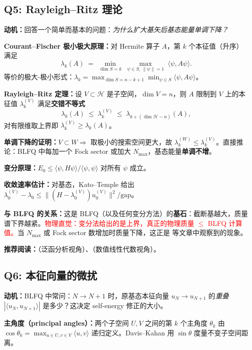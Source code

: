 \documentclass{article}
\begin{document}
\subsection{Q5: Rayleigh--Ritz 理论}

\textbf{动机：}回答一个简单而基本的问题：\emph{为什么扩大基矢后基态能量单调下降？}

\textbf{Courant--Fischer 极小极大原理：}对 Hermite 算子 $A$，第 $k$ 个本征值（升序）满足
\[
\lambda_{k}(A) \;=\; \min_{\dim S=k}\;\max_{\psi\in S,\,\|\psi\|=1}\;\langle\psi,A\psi\rangle.
\]
等价的极大-极小形式：$\lambda_{k}=\max_{\dim S=n-k+1}\min_{\psi\in S}\langle\psi,A\psi\rangle$。

\textbf{Rayleigh--Ritz 定理：}设 $V\subset\mathcal{H}$ 是子空间，$\dim V=n$，则 $A$ 限制到 $V$ 上的本征值 $\lambda_{k}^{(V)}$ 满足\textbf{交错不等式}
\[
\lambda_{k}(A) \;\le\; \lambda_{k}^{(V)} \;\le\; \lambda_{k+( \dim\mathcal{H}-n)}(A),
\]
对有限维取上界即 $\lambda_{k}^{(V)}\ge\lambda_{k}(A)$。

\textbf{单调下降的证明：}$V\subset W\Rightarrow$ 取极小的搜索空间更大，故 $\lambda_{k}^{(W)}\le\lambda_{k}^{(V)}$。直接推论：BLFQ 中每加一个 Fock sector 或加大 $N_{\max}$，基态能量\textbf{单调不增}。

\textbf{变分原理：}$E_{0}\le\langle\psi,H\psi\rangle/\langle\psi,\psi\rangle$ 对所有 $\psi$ 成立。

\textbf{收敛速率估计：}对基态，Kato--Temple 给出 $\lambda_{0}^{(V)}-\lambda_{0}\le \|(H-\lambda_{0}^{(V)})u_{0}^{(V)}\|^{2}/\mathrm{gap}$。

\textbf{与 BLFQ 的关系：}这是 BLFQ（以及任何变分方法）的\textbf{基石}：截断基越大，质量谱下界越紧。\textcolor{red}{物理直觉：变分法给出的是上界，真正的物理质量 $\le$ BLFQ 计算值。}当 $N_{\max}$ 或 Fock sector 数增加时质量下降，这正是 \cite{Li_2016} 等文章中观察到的现象。

\textbf{推荐阅读：}\cite{Reed_Simon_1978}（泛函分析视角）、\cite{Trefethen_Bau_1997}（数值线性代数视角）。

\subsection{Q6: 本征向量的微扰}

\textbf{动机：}BLFQ 中常问：$N\to N+1$ 时，原基态本征向量 $u_{N}\to u_{N+1}$ 的\emph{重叠}$|\langle u_{N},u_{N+1}\rangle|$ 是多少？这决定 self-energy 修正的大小。

\textbf{主角度（principal angles）：}两个子空间 $U,V$ 之间的第 $k$ 个主角度 $\theta_{k}$ 由 $\cos\theta_{k}=\max_{u\in U,v\in V}\langle u,v\rangle$ 递归定义。Davis--Kahan 用 $\sin\theta$ 度量不变子空间距离。
\end{document}
